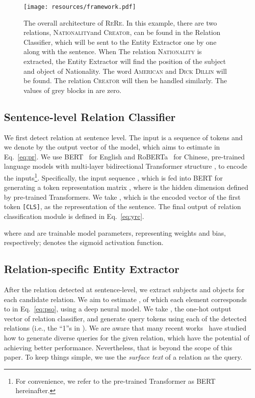 \documentclass[11pt,a4paper]{article}
\begin{document}
\begin{figure*}[!ht]
  \centering
  \texttt{[image: resources/framework.pdf]}
  \caption{The overall architecture of \textsc{ReRe}. In this example, there are two relations, \textsc{Nationality}and \textsc{Creator}, can be found in the Relation Classifier, which will be sent to the Entity Extractor one by one along with the sentence. When The relation \textsc{Nationality} is extracted, the Entity Extractor will find the position of the subject and object of Nationality. The word \textsc{American} and \textsc{Dick Dillin} will be found. The relation \textsc{Creator} will then be handled similarly. The values of grey blocks in  are zero.}
  \label{fig:framework}
\end{figure*}




\subsection{Sentence-level Relation Classifier}
\label{sec:rc}
We first detect relation at sentence level.
The input is a sequence of tokens  and we denote by  the output vector of the model, which aims to estimate  in Eq.~\eqref{eq:pr}.
We use BERT~\cite{Devlin2019BERTPO} for English and RoBERTa~\cite{liu2019roberta} for Chinese, pre-trained language models with multi-layer bidirectional Transformer structure \cite{vaswani2017attention}, to encode the inputs\footnote{For convenience, we refer to the pre-trained Transformer as BERT hereinafter.}.
Specifically, the input sequence , which is fed into BERT for generating a token representation matrix , where  is the hidden dimension defined by pre-trained Transformers.
We take , which is the encoded vector of the first token \texttt{[CLS]}, as the representation of the sentence.
The final output of relation classification module  is defined in Eq.~\eqref{eq:yrc}.


where  and  are trainable model parameters, representing weights and bias, respectively;  denotes the sigmoid activation function.






\subsection{Relation-specific Entity Extractor}
After the relation detected at sentence-level, we extract subjects and objects for each candidate relation.
We aim to estimate , of which each element corresponds to  in Eq.~\eqref{eq:pso}, using a deep neural model.
We take , the one-hot output vector of relation classifier, and generate query tokens  using each of the detected relations (i.e., the ``1''s in ). 
We are aware that many recent works~\cite{Li2019EntityRelationEA,Zhao2020AskingEA} have studied how to generate diverse queries for the given relation, which have the potential of achieving better performance.
Nevertheless, that is beyond the scope of this paper.
To keep things simple, we use the \textit{surface text} of a relation as the query.
\end{document}

